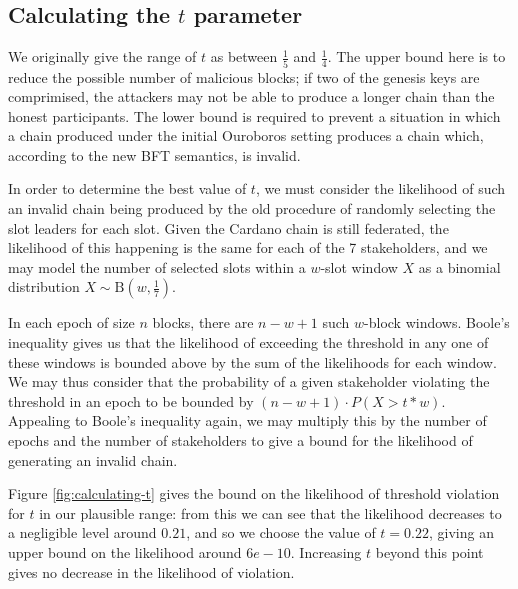 \documentclass[11pt,a4paper]{article}
\begin{document}
\clearpage


\begin{appendices}
  \section{Calculating the $t$ parameter}
  \label{apdx:calculating-t}

  We originally give the range of $t$ as between $\frac{1}{5}$ and $\frac{1}{4}$.
  The upper bound here is to reduce the possible number of malicious blocks; if
  two of the genesis keys are comprimised, the attackers may not be able to
  produce a longer chain than the honest participants. The lower bound is required
  to prevent a situation in which a chain produced under the initial Ouroboros
  setting produces a chain which, according to the new BFT semantics, is invalid.

  In order to determine the best value of $t$, we must consider the likelihood of
  such an invalid chain being produced by the old procedure of randomly selecting
  the slot leaders for each slot. Given the Cardano chain is still federated, the
  likelihood of this happening is the same for each of the 7 stakeholders, and we
  may model the number of selected slots within a $w$-slot window $X$ as a binomial
  distribution $X \sim \mathrm{B}\left(w, \frac{1}{7}\right)$.

  In each epoch of size $n$ blocks, there are $n-w+1$ such $w$-block windows.
  Boole's inequality gives us that the likelihood of exceeding the threshold in
  any one of these windows is bounded above by the sum of the likelihoods for each
  window. We may thus consider that the probability of a given stakeholder
  violating the threshold in an epoch to be bounded by $(n-w+1)\cdot P(X > t*w)$.
  Appealing to Boole's inequality again, we may multiply this by the number of
  epochs and the number of stakeholders to give a bound for the likelihood of
  generating an invalid chain.

  Figure \ref{fig:calculating-t} gives the bound on the likelihood of threshold
  violation for $t$ in our plausible range: from this we can see that the
  likelihood decreases to a negligible level around $0.21$, and so we choose the
  value of $t=0.22$, giving an upper bound on the likelihood around $6e-10$.
  Increasing $t$ beyond this point gives no decrease in the likelihood of
  violation.


\end{appendices}
\end{document}
